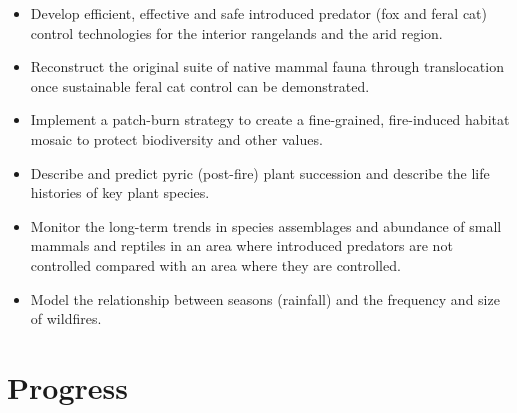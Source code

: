 \documentclass[version=last,
    paper=a4, %
    10pt, %
    usenames,
    dvipsnames,
    oneside, %
    headings=openany, %
    DIV=15 %
]{scrbook}
\begin{document}
\begin{itemize}
\itemsep1pt\parskip0pt
\item
  Develop efficient, effective and safe introduced predator (fox and
  feral cat) control technologies for the interior rangelands and the
  arid region.
\item
  Reconstruct the original suite of native mammal fauna through
  translocation once sustainable feral cat control can be demonstrated.
\item
  Implement a patch-burn strategy to create a fine-grained, fire-induced
  habitat mosaic to protect biodiversity and other values.
\item
  Describe and predict pyric (post-fire) plant succession and describe
  the life histories of key plant species.
\item
  Monitor the long-term trends in species assemblages and abundance of
  small mammals and reptiles in an area where introduced predators are
  not controlled compared with an area where they are controlled.
\item
  Model the relationship between seasons (rainfall) and the frequency
  and size of wildfires.
\end{itemize}




\section*{Progress}
\end{document}

